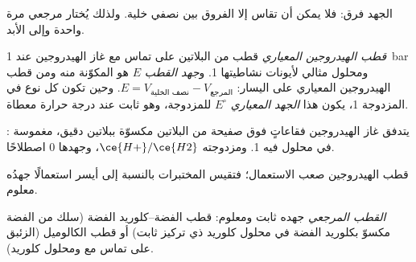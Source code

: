 الجهد فرق: فلا يمكن أن تقاس إلا الفروق بين نصفي خلية. ولذلك
يُختار  مرجعي مرة واحدة وإلى الأبد.

\begin{definition}\label{def:b1:nernst:electrode-potential}
\emph{قطب الهيدروجين المعياري}
قطب من البلاتين على تماس مع غاز الهيدروجين عند \qty{1}{bar}
ومحلول مثالي لأيونات  نشاطيتها 1. و\emph{جهد
القطب} $E$  هو  المكوّنة منه ومن قطب الهيدروجين المعياري على اليسار:
$E = V_{\text{نصف الخلية}} - V_{\text{المرجع}}$. وحين تكون  كل نوع في
المزدوجة 1، يكون هذا \emph{الجهد المعياري}
$E^\circ$ للمزدوجة، وهو ثابت عند درجة حرارة معطاة.
\end{definition}

\begin{omfigure}

{\small {}: يتدفق غاز الهيدروجين فقاعاتٍ فوق
صفيحة من البلاتين مكسوّة ببلاتين دقيق، مغموسة في محلول
  فيه 1. ومزدوجته $\ce{H+}/\ce{H2}$، وجهدها 0
اصطلاحًا.}
\end{omfigure}

قطب الهيدروجين صعب الاستعمال؛ فتقيس المختبرات بالنسبة إلى
 أيسر استعمالًا جهدُه معلوم.

\begin{definition}\label{def:b1:nernst:reference-electrode}
\emph{القطب المرجعي} 
جهده ثابت ومعلوم: قطب الفضة--كلوريد الفضة
(سلك من الفضة مكسوّ بكلوريد الفضة في محلول كلوريد ذي
تركيز ثابت) أو قطب الكالوميل (الزئبق على تماس مع
 ومحلول كلوريد).
\end{definition}


